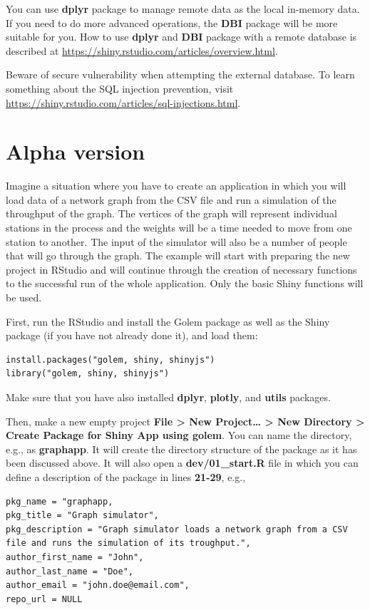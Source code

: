 \documentclass[
]{article}
\begin{document}
You can use \textbf{dplyr} package to manage remote data as the local
in-memory data. If you need to do more advanced operations, the
\textbf{DBI} package will be more suitable for you. How to use
\textbf{dplyr} and \textbf{DBI} package with a remote database is
described at \url{https://shiny.rstudio.com/articles/overview.html}.

Beware of secure vulnerability when attempting the external database. To
learn something about the SQL injection prevention, visit
\url{https://shiny.rstudio.com/articles/sql-injections.html}.

\hypertarget{alpha-version}{%
\section{Alpha version}\label{alpha-version}}

Imagine a situation where you have to create an application in which you
will load data of a network graph from the CSV file and run a simulation
of the throughput of the graph. The vertices of the graph will represent
individual stations in the process and the weights will be a time needed
to move from one station to another. The input of the simulator will
also be a number of people that will go through the graph. The example
will start with preparing the new project in RStudio and will continue
through the creation of necessary functions to the successful run of the
whole application. Only the basic Shiny functions will be used.

First, run the RStudio and install the Golem package as well as the
Shiny package (if you have not already done it), and load them:

\begin{verbatim}
install.packages("golem, shiny, shinyjs")
library("golem, shiny, shinyjs")
\end{verbatim}

Make sure that you have also installed \textbf{dplyr}, \textbf{plotly},
and \textbf{utils} packages.

Then, make a new empty project \textbf{File \textgreater{} New
Project\ldots{} \textgreater{} New Directory \textgreater{} Create
Package for Shiny App using golem}. You can name the directory, e.g., as
\textbf{graphapp}. It will create the directory structure of the package
as it has been discussed above. It will also open a
\textbf{dev/01\_start.R} file in which you can define a description of
the package in lines \textbf{21-29}, e.g.,

\begin{verbatim}
pkg_name = "graphapp,   
pkg_title = "Graph simulator",    
pkg_description = "Graph simulator loads a network graph from a CSV file and runs the simulation of its troughput.",    
author_first_name = "John",    
author_last_name = "Doe",    
author_email = "john.doe@email.com",    
repo_url = NULL
\end{verbatim}
\end{document}

